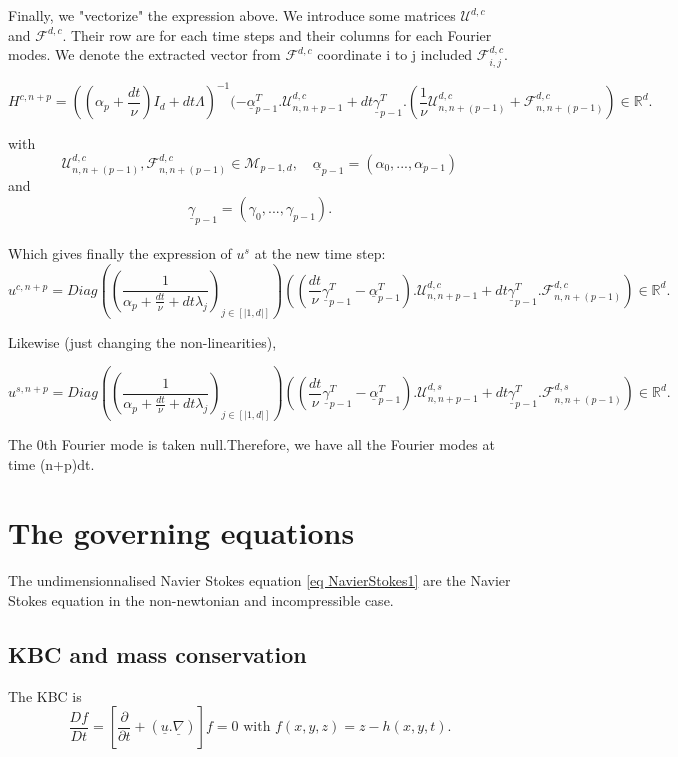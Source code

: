 \documentclass[12pt]{article}
\begin{document}
Finally, we "vectorize" the expression above. We introduce some matrices $\mathcal{U}^{d,c}$ and $\mathcal{F}^{d,c}$. Their row are for each time steps and their columns for each Fourier modes. We denote the extracted vector from $\mathcal{F}^{d,c}$ coordinate i to j included $\mathcal{F}_{i,j}^{d,c}$.


  $$H^{c, n+p}= ((\alpha_p+\frac{dt}{\nu}) I_d + dt\Lambda)^{-1}(-\underline{\alpha}_{p-1}^T.\mathcal{U}_{n, n+p-1}^{d,c}+ dt \underline{\gamma}_{p-1}^T.(\frac{1}{\nu} \mathcal{U}_{n, n+(p-1)}^{d,c} + \mathcal{F}_{n, n+(p-1)}^{d,c}) \in \mathbb{R}^d.$$

with  
$$\mathcal{U}_{n, n+(p-1)}^{d,c}, \mathcal{F}_{n, n+(p-1)}^{d,c} \in \mathcal{M}_{p-1, d},\quad \underline{\alpha}_{p-1} = (\alpha_0,..., \alpha_{p-1}) $$
and $$\underline{\gamma}_{p-1}= (\gamma_0, ..., \gamma_{p-1}).$$
\\ 

Which gives finally the expression of $u^s$ at the new time step:  
\begin{equation}
    \boxed{
    u^{c, n+p}= Diag((\frac{1}{\alpha_p+\frac{dt}{\nu} + dt\lambda_j})_{j\in [|1, d|]}) ((\frac{dt}{\nu} \underline{\gamma}_{p-1}^T-\underline{\alpha}_{p-1}^T).\mathcal{U}_{n, n+p-1}^{d,c}+ dt \underline{\gamma}_{p-1}^T.\mathcal{F}_{n, n+(p-1)}^{d, c}) \in \mathbb{R}^d.
    }
\end{equation}

Likewise (just changing the non-linearities),

\begin{equation}
    \boxed{
    u^{s, n+p}= Diag((\frac{1}{\alpha_p+\frac{dt}{\nu} + dt\lambda_j})_{j\in [|1, d|]}) ((\frac{dt}{\nu} \underline{\gamma}_{p-1}^T-\underline{\alpha}_{p-1}^T).\mathcal{U}_{n, n+p-1}^{d,s}+ dt \underline{\gamma}_{p-1}^T.\mathcal{F}_{n, n+(p-1)}^{d, s}) \in \mathbb{R}^d.
    }
\end{equation}

The 0th Fourier mode is taken null.Therefore, we have all the Fourier modes at time (n+p)dt.

\section{The governing equations}
The undimensionnalised Navier Stokes  equation \ref{eq NavierStokes1} are the Navier Stokes equation in the non-newtonian and incompressible case. 

\subsection{KBC and mass conservation}
The KBC is $$\frac{Df}{Dt}=\left[\frac{\partial}{\partial t}+(\underline{u}.\underline{\nabla})\right]f=0 \text{  with } f(x, y, z) = z-h(x, y, t).$$
\end{document}
